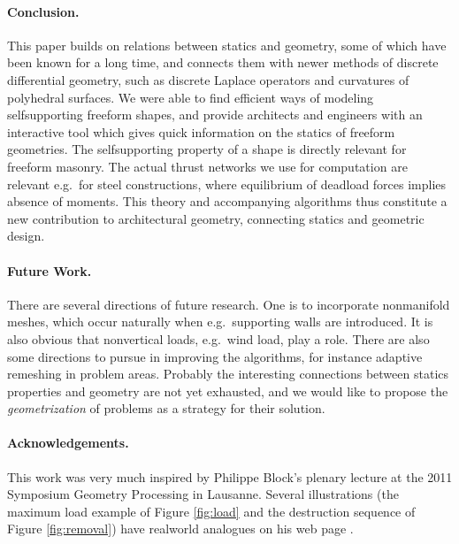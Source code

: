 \documentclass[review]{acmsiggraph}
\begin{document}
\paragraph{Conclusion.}

This paper builds on relations between statics and geometry, some of which 
have been known for a long time, and connects them with newer methods of 
discrete differential geometry, such as discrete Laplace operators and 
curvatures of polyhedral surfaces. We were able to find efficient ways of 
modeling self\dash supporting freeform shapes, and provide architects and 
engineers with an interactive tool which gives quick information on the 
statics of freeform geometries. The self\dash supporting property of a 
shape is directly relevant for freeform masonry. The actual thrust 
networks we use for computation are relevant e.g.\ for steel 
constructions, where equilibrium of deadload forces implies absence of 
moments. This theory and accompanying algorithms thus constitute a new 
contribution to architectural geometry, connecting statics and geometric 
design.

\paragraph{Future Work.}

There are several directions of future research. One is to incorporate 
non\dash manifold meshes, which occur naturally when e.g.\ supporting 
walls are introduced. It is also obvious that non\dash vertical loads, 
e.g.\ wind load, play a role. There are also some directions to pursue in 
improving the algorithms, for instance adaptive remeshing in problem 
areas. Probably the interesting connections between statics properties and 
geometry are not yet exhausted, and we would like to propose the {\em 
geometrization} of problems as a strategy for their solution.

\paragraph*{Acknowledgements.}

This work was very much inspired by Philippe Block's plenary lecture
at the 2011 Symposium Geometry Processing in Lausanne. Several 
illustrations (the maximum load example of Figure
\ref{fig:load} and the destruction sequence of Figure \ref{fig:removal})
have real\dash world analogues on his web page \cite{catalan}.

	
	
\end{document}
